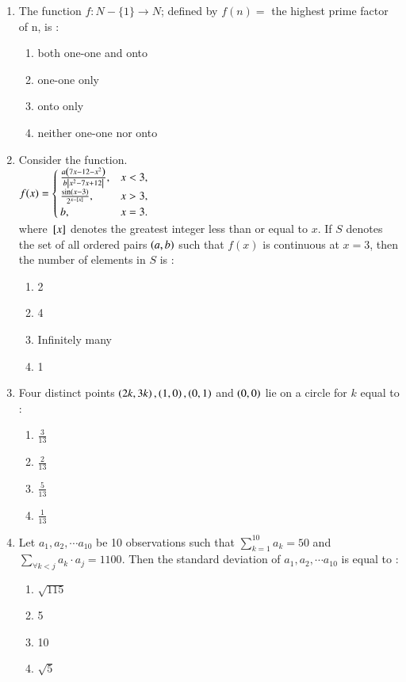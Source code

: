 \documentclass[journal]{IEEEtran}
\begin{document}
\begin{enumerate}[start=16]
\item The function $f  : N-{\{1}\}\rightarrow N$; defined by $f(n)=$ the highest prime factor of n, is :
\begin{enumerate}
    \item both one-one and onto
    \item one-one only
    \item onto only
    \item neither one-one nor onto
\end{enumerate}

\item Consider the function.\\
$f(x)= \begin{cases} 
\frac{a \left(7x - 12 - x^2\right)}{b\left\vert x^2 - 7x + 12\right\vert}, & x < 3, \\
\frac{\sin(x - 3)}{2^{x - {}\left[x\right]}}, & x > 3, \\
b, & x = 3.
\end{cases}
$\\
where ${}\left[x\right]$ denotes the greatest integer less than or equal to $x$. If $S$ denotes the set of all ordered pairs $\left(a,b\right)$ such that $f(x)$ is continuous at $x=3$, then the number of elements in $S$ is : 
\begin{enumerate}
    \item 2
    \item 4
    \item Infinitely many
    \item 1
\end{enumerate}

\item Four distinct points $\left(2k,3k\right), \left(1,0\right), \left(0,1\right)$ and $\left(0,0\right)$ lie on a circle for $k$ equal to :
\begin{enumerate}
    \item $\frac{3}{13}$\\
    \item $\frac{2}{13}$\\
    \item $\frac{5}{13}$\\
    \item $\frac{1}{13}$
\end{enumerate}

\item Let $a_1, a_2, \cdots a_{10}$ be 10 observations such that  $\sum_{k=1}^{10} a_k=50$ and $\sum_{\forall k < j} a_k \cdot a_j = 1100$. Then the standard deviation of $a_1,a_2,\cdots a_{10}$ is equal to :
\begin{enumerate}
    \item $\sqrt{115}$
    \item 5
    \item 10
    \item $\sqrt{5}$
\end{enumerate}


\end{enumerate}
\end{document}

